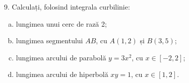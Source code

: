 \vspace{1cm}

9. Calculați, folosind integrala curbilinie:
\begin{enumerate}[(a)]
\item lungimea unui cerc de rază 2;
\item lungimea segmentului $ AB $, cu $ A(1, 2) $ și $ B(3, 5) $;
\item lungimea arcului de parabolă $ y = 3x^2 $, cu $ x \in [-2, 2] $;
\item lungimea arcului de hiperbolă $ xy = 1 $, cu $ x \in [1, 2] $.
\end{enumerate}

